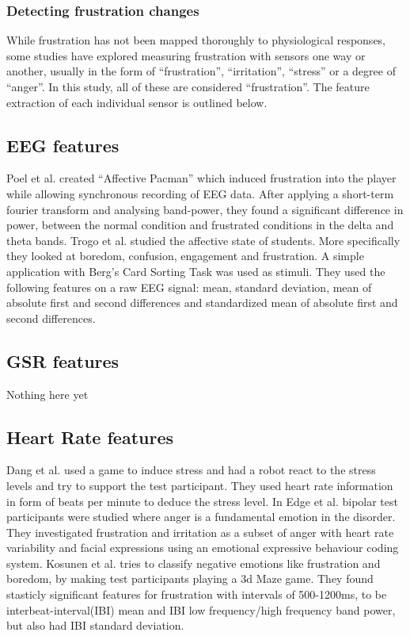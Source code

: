 \subsubsection{Detecting frustration changes}
While frustration has not been mapped thoroughly to physiological responses, some studies have explored measuring frustration with sensors one way or another, usually in the form of ``frustration'', ``irritation'', ``stress'' or a degree of ``anger''. In this study, all of these are considered ``frustration''. 
The feature extraction of each individual sensor is outlined below.

\subsection{EEG features}
Poel et al. \cite{affective_pacman} created ``Affective Pacman'' which induced frustration into the player while allowing synchronous recording of EEG data. After applying a short-term fourier transform and analysing band-power, they found a significant difference in power, between the normal condition and frustrated conditions in the delta and theta bands.
Trogo et al. \cite{brainwave_signals_frustration} studied the affective state of students. More specifically they looked at boredom, confusion, engagement and frustration. 
A simple application with Berg's Card Sorting Task\cite{bergs_card_sorting} was used as stimuli.
They used the following features on a raw EEG signal: mean, standard deviation, mean of absolute first and second differences and standardized mean of absolute first and second differences.

\subsection{GSR features}
Nothing here yet

\subsection{Heart Rate features}
Dang et al.\cite{stress_robot} used a game to induce stress and had a robot react to the stress levels and try to support the test participant. 
They used heart rate information in form of beats per minute to deduce the stress level.
In Edge et al. \cite{bipolar_frustration} bipolar test participants were studied where anger is a fundamental emotion in the disorder. 
They investigated frustration and irritation as a subset of anger with heart rate variability and facial expressions using an emotional expressive behaviour coding system. 
Kosunen et al. \cite{boredom_negative_mood_features} tries to classify negative emotions like frustration and boredom, by making test participants playing a 3d Maze game. 
They found stasticly significant features for frustration with intervals of 500-1200ms, to be interbeat-interval(IBI) mean and IBI low frequency/high frequency band power, but also had IBI standard deviation.


